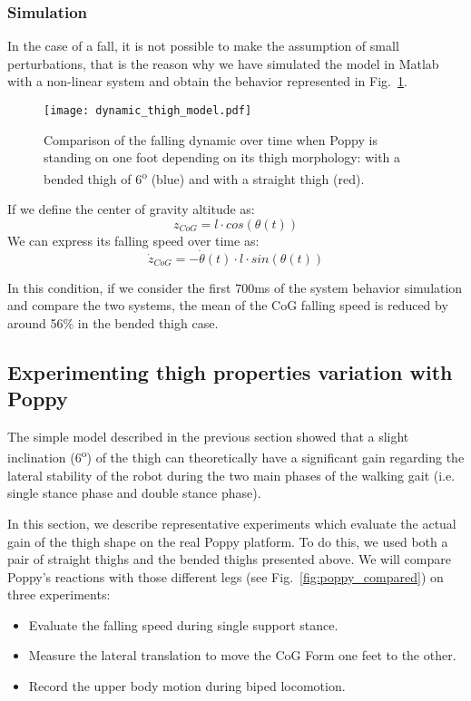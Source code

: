 \subsubsection{Simulation} %

In the case of a fall, it is not possible to make the assumption of small perturbations, that is the reason why we have simulated the model in Matlab with a non-linear system and obtain the behavior represented in Fig.~\ref{fig:dynamic_thigh_model}.

\begin{figure}[thpb]
    \centering
    \texttt{[image: dynamic\_thigh\_model.pdf]}
    \caption{Comparison of the falling dynamic over time when Poppy is standing on one foot depending on  its thigh morphology: with a bended thigh of 6\textsuperscript{o} (blue) and with a straight thigh (red).}
    \label{fig:dynamic_thigh_model}
\end{figure}

If we define the center of gravity altitude as:
\begin{equation}
    z_{CoG} = l \cdot cos(\theta(t))
\end{equation}
We can express its falling speed over time as:
\begin{equation}
    \dot{z}_{CoG} = - \dot{\theta}(t) \cdot l \cdot sin(\theta(t))
\end{equation}

In this condition, if we consider the first 700ms of the system behavior simulation and compare the two systems, the mean of the CoG falling speed is reduced by around 56\% in the bended thigh case.


\subsection{Experimenting thigh properties variation with Poppy} %

The simple model described in the previous section showed that a slight inclination (6\textsuperscript{o}) of the thigh can theoretically have a significant gain regarding the lateral stability of the robot during the two main phases of the walking gait (i.e. single stance phase and double stance phase).

In this section, we describe representative experiments which evaluate the actual gain of the thigh shape on the real Poppy platform. To do this, we used both a pair of straight thighs and the bended thighs presented above. We will compare Poppy's reactions with those different legs (see Fig.~\ref{fig:poppy_compared}) on three experiments:
\begin{itemize}
    \item Evaluate the falling speed during single support stance.
    \item Measure the lateral translation to move the CoG Form one feet to the other.
    \item Record the upper body motion during biped locomotion.
\end{itemize}

